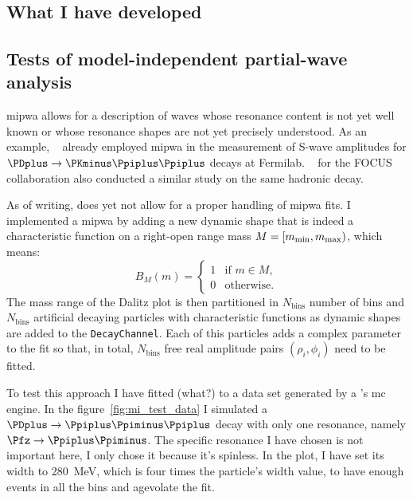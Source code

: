 \chapter{}
\label{chap:model_independent_pwa}

    \section{What I have developed}

    \section{Tests of model-independent partial-wave analysis}
    \ac{mipwa} allows for a description of waves whose resonance content is not yet well known or whose resonance shapes are not yet precisely understood.
    As an example, \citeauthor{PhysRevD.73.032004}~\cite{PhysRevD.73.032004} already employed \ac{mipwa} in the measurement of S-wave amplitudes for $\PDplus\to\PKminus\Ppiplus\Ppiplus$ decays at Fermilab.
    \citeauthor{Link200914}~\cite{Link200914} for the {\small FOCUS} collaboration also conducted a similar study on the same hadronic decay.


    As of writing,  does yet not allow for a proper handling of \ac{mipwa} fits.
    I implemented a \ac{mipwa} by adding a new dynamic shape that is indeed a characteristic function on a right-open range mass $M = [m_\textup{min}, m_\textup{max})$, which means:
    \begin{equation}
        B_M(m) = 
        \begin{cases}
            1 &\text{if }m\in M, \\
            0 &\text{otherwise}.
        \end{cases}
    \end{equation}
    The mass range of the Dalitz plot is then partitioned in $N_\text{bins}$ number of bins and $N_\text{bins}$ artificial decaying particles with characteristic functions as dynamic shapes are added to the \lstinline!DecayChannel!.
    Each of this particles adds a complex parameter to the fit so that, in total, $N_\text{bins}$ free real amplitude pairs $(\rho_i,\phi_i)$ need to be fitted.


    To test this approach I have fitted (what?) to a data set generated by a 's \ac{mc} engine.
    In the figure~\ref{fig:mi_test_data} I simulated a $\PDplus\to\Ppiplus\Ppiminus\Ppiplus$ decay with only one resonance, namely $\Pfz\to\Ppiplus\Ppiminus$.
    The specific resonance I have chosen is not important here, I only chose it because it's spinless.
    In the plot, I have set its width to \SI{280}{\mega\electronvolt}, which is four times the particle's width value, to have enough events in all the bins and agevolate the fit.


